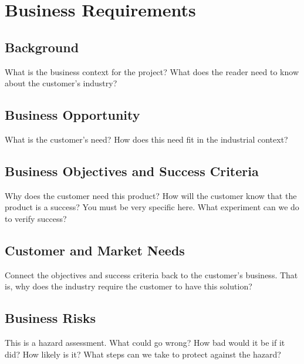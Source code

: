 \section{Business Requirements}
\subsection{Background}
 What is the business context for the project?
 What does the reader need to know about the customer's industry?

\subsection{Business Opportunity}
 What is the customer's need?
 How does this need fit in the industrial context?

\subsection{Business Objectives and Success Criteria}
 Why does the customer need this product?
 How will the customer know that the product is a success?
   You must be very specific here.  What experiment can we do to verify success?

\subsection{Customer and Market Needs}
 Connect the objectives and success criteria back to the customer's business.
 That is, why does the industry require the customer to have this solution? 

\subsection{Business Risks}
 This is a hazard assessment.  What could go wrong?  How bad would it be if it
 did?  How likely is it?  What steps can we take to protect against the hazard? 

